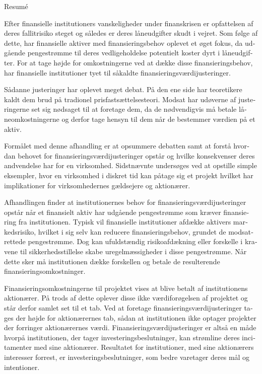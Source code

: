 \documentclass[main.tex]{subfiles}
\begin{document}
    \begin{otherlanguage}{danish}
    \thispagestyle{empty}
    \begin{adjustwidth}{-1cm}{-1cm}
    \begin{center}
    {\LARGE Resumé}
    \end{center}

    Efter finansielle institutioners vanskeligheder under finanskrisen 
    er opfattelsen af deres fallitrisiko steget og således er deres låneudgifter skudt i vejret.
    Som følge af dette, har finansielle aktiver med finansieringsbehov oplevet et øget fokus, 
    da udgående pengestrømme til deres vedligeholdelse potentielt koster dyrt i låneudgifter.
    For at tage højde for omkostningerne ved at dække disse finansieringsbehov,
    har finansielle institutioner tyet til såkaldte finansieringsværdijusteringer.

    Sådanne justeringer har oplevet meget debat. 
    På den ene side har teoretikere kaldt dem brud på tradionel prisfastsættelsesteori.
    Modsat har udøverne af justeringerne set sig nødsaget til at foretage dem,
    da de nødvendigvis må betale låneomkostningerne 
    og derfor tage hensyn til dem når de bestemmer værdien på et aktiv. 

    Formålet med denne afhandling er at opsummere debatten
    samt at forstå hvordan behovet for finansieringsværdijusteringer opstår 
    og hvilke konsekvenser deres andvendelse har for en virksomhed.
    Sidstnævnte undersøges ved at opstille simple eksempler,
    hvor en virksomhed i diskret tid kan påtage sig et projekt
    hvilket har implikationer for virksomhedernes gældsejere og aktionærer.

    Afhandlingen finder at institutionernes behov for finansieringsværdijusteringer opstår 
    når et finansielt aktiv har udgående pengestrømme som kræver finansiering fra institutionen.
    Typisk vil finansielle institutioner afdække aktivers markedsrisiko,
    hvilket i sig selv kan reducere finansieringsbehov, grundet de modsatrettede pengestrømme.
    Dog kan ufuldstændig risikoafdækning eller forskelle i kravene til sikkerhedsstillelse
    skabe uregelmæssigheder i disse pengestrømme. 
    Når dette sker må institutionen dække forskellen 
    og betale de resulterende finansieringsomkostninger.
    
    Finansieringsomkostningerne til projektet vises at blive betalt af institutionens aktionærer.
    På trods af dette oplever disse ikke værdiforøgelsen af projektet
    og står derfor samlet set til et tab.
    Ved at foretage finansieringsværdijusteringer tages der højde for aktionærernes tab,
    sådan at institutionen ikke optager projekter der forringer aktionærernes værdi.
    Finansieringsværdijusteringer er altså en måde hvorpå institutionen, 
    der tager investeringsbeslutninger, kan strømline deres incitamenter med sine aktionærer. 
    Resultatet for institutioner, med sine aktionærers interesser forrest,
    er investeringsbeslutninger, som bedre varetager deres mål og intentioner.
    
    \end{adjustwidth}
    \end{otherlanguage}
\end{document}
